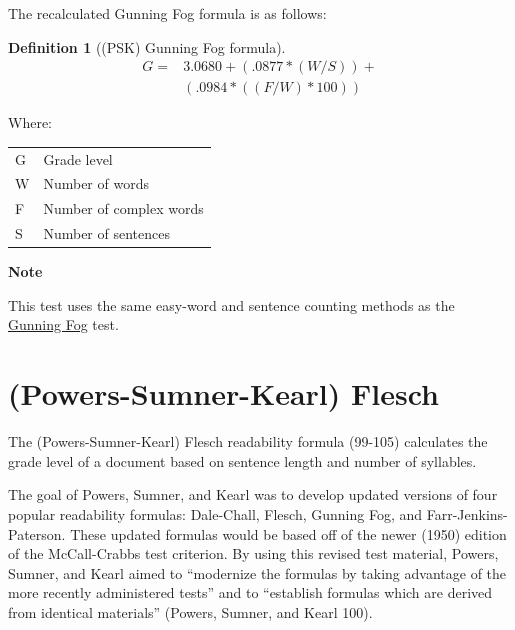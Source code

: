 \documentclass[
]{book}
\newenvironment{notesection}
    {
    \begin{tcolorbox}[colframe=mediumblue,colback=lightblue,coltext=mediumblue,arc=3mm]
    \faLightbulb[regular] \textbf{Note} \newline
    }
    {
    \end{tcolorbox}
    }
\theoremstyle{definition}
\newtheorem{definition}{Definition}[chapter]
\theoremstyle{definition}
\theoremstyle{definition}
\theoremstyle{definition}
\theoremstyle{remark}
\begin{document}
The recalculated Gunning Fog formula is as follows:

\begin{definition}[(PSK) Gunning Fog formula]
\protect\hypertarget{def:pskfog}{}{\label{def:pskfog} {} }\begin{align*}
  G = & 3.0680 + (.0877*(W/S)) + \\
      & (.0984*((F/W)*100))
\end{align*}
\end{definition}

Where:

\begin{longtable}[]{@{}
  >{\raggedright\arraybackslash}p{}
  >{\raggedright\arraybackslash}p{}@{}}
\toprule
\endhead
G & Grade level \\
W & Number of words \\
F & Number of complex words \\
S & Number of sentences \\
\bottomrule
\end{longtable}

\begin{notesection}
This test uses the same easy-word and sentence counting methods as the \protect\hyperlink{gunning-fog-test}{Gunning Fog} test.

\end{notesection}


\newpage

\hypertarget{psk-test}{%
\section{\texorpdfstring{(Powers-Sumner-Kearl) Flesch}{(Powers-Sumner-Kearl) Flesch}}\label{psk-test}}

The (Powers-Sumner-Kearl) Flesch readability formula (99-105) calculates the grade level of a document based on sentence length and number of syllables.

The goal of Powers, Sumner, and Kearl was to develop updated versions of four popular readability formulas: Dale-Chall, Flesch, Gunning Fog, and Farr-Jenkins-Paterson. These updated formulas would be based off of the newer (1950) edition of the McCall-Crabbs test criterion. By using this revised test material, Powers, Sumner, and Kearl aimed to ``modernize the formulas by taking advantage of the more recently administered tests'' and to ``establish formulas which are derived from identical materials'' (Powers, Sumner, and Kearl 100).
\end{document}

